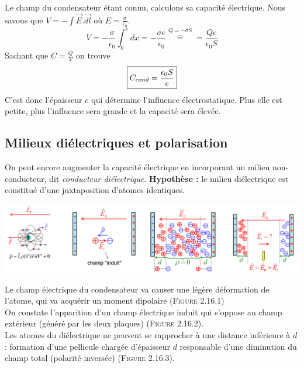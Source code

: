 \documentclass	[11pt, a4paper, openany]{book}
\begin{document}
Le champ du condensateur étant connu, calculons sa capacité électrique. Nous savous que $V = - \int \vec{E}.\vec{dl}$ où $E = \frac{\sigma}{\epsilon_0}$.
\begin{equation}
	V = -\frac{\sigma}{\epsilon_0}\int_0^e dx = -\frac{\sigma e}{\epsilon_0} \overbrace{=}^{Q = -\sigma S} = \frac{Qe}{\epsilon_0 S}
\end{equation}
Sachant que $C = \frac{Q}{V}$ on trouve
\begin{equation}
	\fbox{$C_{cond} = \dfrac{\epsilon_0 S}{e}$}
\end{equation}
C'est donc l'épaisseur $e$ qui détermine l'influence électrostatique. Plus elle est petite, plus l'influence sera grande et la capacité sera élevée.

\subsection{Milieux diélectriques et polarisation}
On peut encore augmenter la capacité électrique en incorporant un milieu non-conducteur, dit \textit{conducteur diélectrique}. \textbf{Hypothèse :} le milieu diélectrique est constitué d'une juxtaposition d'atomes identiques.
\begin{center}
	\includegraphics[scale=0.48]{es/image16.png}
\end{center}
Le champ électrique du condensateur va causer une légère déformation de l'atome, qui va acquérir un moment dipolaire (\textsc{Figure 2.16.1})\\
On constate l'apparition d'un champ électrique induit qui s'oppose au champ extérieur (généré par les deux plaques) (\textsc{Figure 2.16.2}).\\

Les atomes du diélectrique ne peuvent se rapprocher à une distance inférieure à $d$ : formation d'une pellicule chargée d'épaisseur $d$ responsable d'une diminution du champ total (polarité inversée) (\textsc{Figure 2.16.3}).\\
\end{document}
